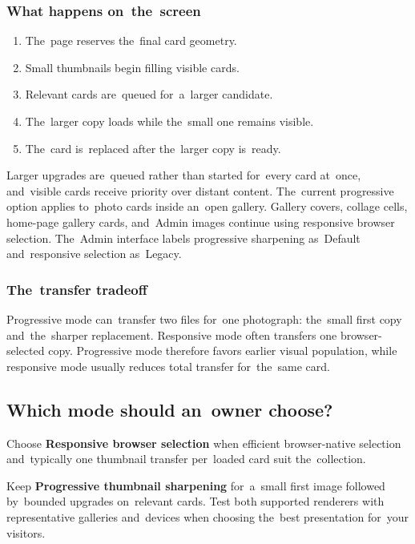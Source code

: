 \documentclass[11pt,a4paper]{article}
\newcommand{\ui}[1]{\textbf{#1}}
\begin{document}
\subsubsection{What happens on~the~screen}

\begin{enumerate}
  \item The~page reserves the~final card geometry.
  \item Small thumbnails begin filling visible cards.
  \item Relevant cards are~queued for~a~larger candidate.
  \item The~larger copy loads while the~small one remains visible.
  \item The~card is~replaced after the~larger copy is~ready.
\end{enumerate}

Larger upgrades are~queued rather than started for~every card at~once,
and~visible cards receive priority over distant content. The~current progressive
option applies to~photo cards inside an~open gallery. Gallery covers, collage
cells, home-page gallery cards, and~Admin images continue using responsive
browser selection. The~Admin interface labels progressive sharpening as~Default
and~responsive selection as~Legacy.

\subsubsection{The~transfer tradeoff}

Progressive mode can~transfer two files for~one photograph: the~small first copy
and~the~sharper replacement. Responsive mode often transfers one
browser-selected copy. Progressive mode therefore favors earlier visual
population, while responsive mode usually reduces total transfer for~the~same
card.

\subsection{Which mode should an~owner choose?}

Choose \ui{Responsive browser selection} when efficient browser-native selection
and~typically one thumbnail transfer per~loaded card suit the~collection.

Keep \ui{Progressive thumbnail sharpening} for~a~small first image followed
by~bounded upgrades on~relevant cards. Test both supported renderers with
representative galleries and~devices when choosing the~best presentation
for~your visitors.
\end{document}
